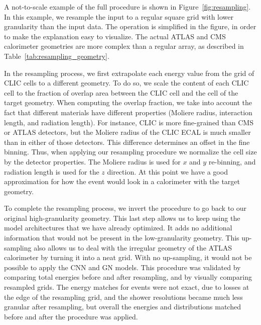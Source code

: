 A not-to-scale example of the full procedure is shown in Figure~\ref{fig:resampling}. In this example, we resample the input to a regular square grid with lower granularity than the input data. The operation is simplified in the figure, in order to make the explanation easy to visualize. The actual ATLAS and CMS calorimeter geometries are more complex than a regular array, as described in Table~\ref{tab:resampling_geometry}.

In the resampling process, we first extrapolate each energy value from the grid of CLIC cells to a different geometry. To do so, we scale the content of each CLIC cell to the fraction of overlap area between the CLIC cell and the cell of the target geometry. When computing the overlap fraction, we take into account the fact that different materials have different properties (Moliere radius, interaction length, and radiation length). For instance, CLIC is more fine-grained than CMS or ATLAS detectors, but the Moliere radius of the CLIC ECAL is much smaller than in either of those detectors. This difference determines an offset in the fine binning. Thus, when applying our resampling procedure we normalize the cell size by the detector properties. The Moliere radius is used for $x$ and $y$ re-binning, and radiation length is used for the $z$ direction. At this point we have a good approximation for how the event would look in a calorimeter with the target geometry.

To complete the resampling process, we invert the procedure to go back to our original high-granularity geometry. This last step allows us to keep using the model architectures that we have already optimized. It adds no additional information that would not be present in the low-granularity geometry. This up-sampling also allows us to deal with the irregular geometry of the ATLAS calorimeter by turning it into a neat grid. With no up-sampling, it would not be possible to apply the CNN and GN models. This procedure was validated by comparing total energies before and after resampling, and by visually comparing resampled grids. The energy matches for events were not exact, due to losses at the edge of the resampling grid, and the shower resolutions became much less granular after resampling, but overall the energies and distributions matched before and after the procedure was applied.

